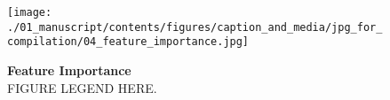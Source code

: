 \begin{figure*}[htbp]
    \centering
    \texttt{[image: ./01\_manuscript/contents/figures/caption\_and\_media/jpg\_for\_compilation/04\_feature\_importance.jpg]}
    \caption{\textbf{Feature Importance}\\
\smallskip
FIGURE LEGEND HERE.
}
    \label{fig:4_feature_importance}
\end{figure*}

